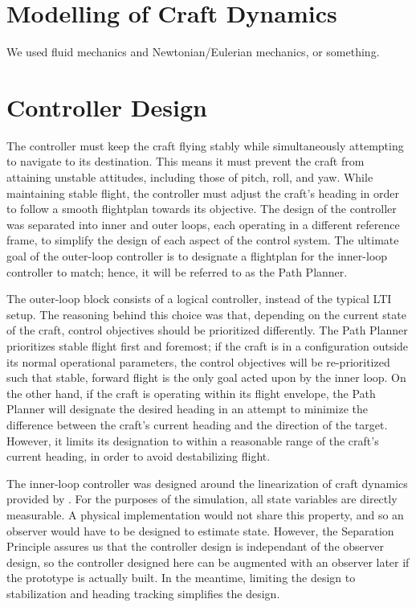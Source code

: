 \documentclass{sydeStyle}
\begin{document}
\section{Modelling of Craft Dynamics}
We used fluid mechanics and Newtonian/Eulerian mechanics, or something.

\section{Controller Design}
The controller must keep the craft flying stably while simultaneously attempting
to navigate to its destination.  This means it must prevent the craft from
attaining unstable attitudes, including those of pitch, roll, and yaw.  While
maintaining stable flight, the controller must adjust the craft's heading in
order to follow a smooth flightplan towards its objective.  The design of the
controller was separated into inner and outer loops, each operating in a
different reference frame, to simplify the design of each aspect of the control
system.  The ultimate goal of the outer-loop controller is to designate a
flightplan for the inner-loop controller to match; hence, it will be referred to
as the Path Planner.


The outer-loop block consists of a logical controller, instead of the typical
LTI setup.  The reasoning behind this choice was that, depending on the current
state of the craft, control objectives should be prioritized differently.  The
Path Planner prioritizes stable flight first and foremost; if the craft is in a
configuration outside its normal operational parameters, the control objectives
will be re-prioritized such that stable, forward flight is the only goal acted
upon by the inner loop.  On the other hand, if the craft is operating within its
flight envelope, the Path Planner will designate the desired heading in an
attempt to minimize the difference between the craft's current heading and the
direction of the target.  However, it limits its designation to within a
reasonable range of the craft's current heading, in order to avoid destabilizing
flight.


The inner-loop controller was designed around the linearization of craft
dynamics provided by \cite{spottiswoode}.  For the purposes of the simulation,
all state variables are directly measurable.  A physical implementation would
not share this property, and so an observer would have to be designed to
estimate state.  However, the Separation Principle assures us that the
controller design is independant of the observer design, so the controller
designed here can be augmented with an observer later if the prototype is
actually built.  In the meantime, limiting the design to stabilization and
heading tracking simplifies the design.
\end{document}
